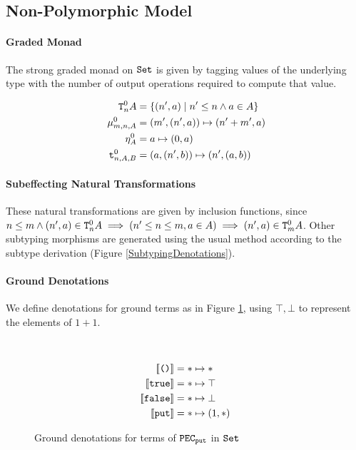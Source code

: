     \subsection{Non-Polymorphic Model}
    \paragraph{Graded Monad}
    The strong graded monad on $\texttt{Set}$ is given by tagging values of the underlying type with the number of output operations required to compute that value.

    \begin{align}
        \label{AdequacyGradedMonad}
        \texttt{T}^0_{n}A & = \{(n', a) \mid n'\leq n\wedge a\in A \}\\
        \mu_{m, n, A}^0 & = (m', (n', a))\mapsto (n' + m', a)\\
        \eta_{A}^0 & = a\mapsto (0, a)\\\
        \texttt{t}_{n, A, B}^0 & = (a, (n', b)) \mapsto (n', (a, b))
    \end{align}


\paragraph{Subeffecting Natural Transformations}
These natural transformations are given by inclusion functions, since $n\leq m\wedge (n',a)\in\texttt{T}^0_{n}A \implies (n'\leq n \leq m, a\in A)\implies (n',a)\in\texttt{T}^0_{m}A$. Other subtyping morphisms are generated using the usual method according to the subtype derivation (Figure \ref{SubtypingDenotations}).

\paragraph{Ground Denotations}
We define denotations for ground terms as in Figure \ref{PECPUTGroundDenotations}, using $\top, \bot$ to represent the elements of $1+1$.

\begin{figure}[H]
    \centering
    \
        \begin{framed}
            
\begin{align*}
    \deno{\u} & = \singleton\mapsto \singleton\\
    \deno{\t} & = \singleton\mapsto \top\\
    \deno{\f} & = \singleton\mapsto \bot\\
    \deno{\put} & = \singleton\mapsto (1, \singleton)
\end{align*}
\end{framed}

    \caption{Ground denotations for terms of $\texttt{PEC}_{\texttt{put}}$ in $\texttt{Set}$}
    \label{PECPUTGroundDenotations}
\end{figure}





